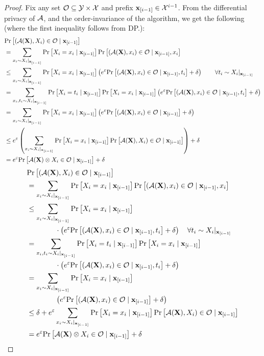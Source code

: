 \begin{proof}
Fix any set $\mathcal{O} \subseteq \mathcal{Y} \times \mathcal{X}$ and prefix $\mathbf{x}_{[i-1]} \in \mathcal{X}^{i-1}$. From the differential privacy of $\mathcal{A}$, and the order-invariance of the algorithm, we get the following (where the first inequality follows from DP.):
\ifnum{}
\begin{align*}
& \mathrm{Pr}\left[(\mathcal{A}(\mathbf{X}),X_i )  \in\mathcal{O}  \mid \mathbf{x}_{[i-1]}\right]\\
&= \sum_{x_i \sim X_i |_{\mathbf{x}_{[i-1]}}}\mathrm{Pr}\left[X_i = x_i \mid \mathbf{x}_{[i-1]}\right] \mathrm{Pr}\left[(\mathcal{A}(\mathbf{X}),x_i ) \in \mathcal{O}  \mid \mathbf{x}_{[i-1]}, x_i\right] \\
&\leq \sum_{x_i \sim X_i |_{\mathbf{x}_{[i-1]}}}\mathrm{Pr}\left[X_i = x_i\mid \mathbf{x}_{[i-1]}\right]\left( e^{\varepsilon} \mathrm{Pr}\left[(\mathcal{A}(\mathbf{X}),x_i ) \in \mathcal{O} \mid \mathbf{x}_{[i-1]}, t_i\right] + \delta \right)
\qquad \forall t_i \sim X_i |_{\mathbf{x}_{[i-1]}}\\
&= \sum_{x_i,t_i \sim X_i |_{\mathbf{x}_{[i-1]}}}\mathrm{Pr}\left[X_i = t_i \mid \mathbf{x}_{[i-1]}\right]\mathrm{Pr}\left[X_i = x_i\mid \mathbf{x}_{[i-1]}\right]\left( e^{\varepsilon} \mathrm{Pr}\left[(\mathcal{A}(\mathbf{X}),x_i ) \in \mathcal{O} \mid \mathbf{x}_{[i-1]}, t_i\right] + \delta \right)
\\
&= \sum_{x_i \sim X_i |_{\mathbf{x}_{[i-1]}}}\mathrm{Pr}\left[X_i = x_i\mid \mathbf{x}_{[i-1]}\right]\left( e^{\varepsilon} \mathrm{Pr}\left[(\mathcal{A}(\mathbf{X}),x_i ) \in \mathcal{O} \mid \mathbf{x}_{[i-1]}\right] + \delta \right)\\
&\leq e^{\varepsilon}\left(\sum_{x_i \sim X_i |_{\mathbf{x}_{[i-1]}}} \mathrm{Pr}\left[X_i = x_i\mid \mathbf{x}_{[i-1]}\right]\mathrm{Pr}\left[\mathcal{A}(\mathbf{X}),X_i ) \in \mathcal{O} \mid \mathbf{x}_{[i-1]}\right]\right) + \delta\\
&= e^{\varepsilon}\mathrm{Pr}\left[\mathcal{A}(\mathbf{X}) \otimes X_i   \in \mathcal{O}  \mid \mathbf{x}_{[i-1]}\right] + \delta
\end{align*}
\else
\begin{align*}
& \mathrm{Pr}\left[(\mathcal{A}(\mathbf{X}),X_i )  \in\mathcal{O}  \mid \mathbf{x}_{[i-1]}\right]\\
&= \sum_{x_i \sim X_i |_{\mathbf{x}_{[i-1]}}}\mathrm{Pr}\left[X_i = x_i \mid \mathbf{x}_{[i-1]}\right] \mathrm{Pr}\left[(\mathcal{A}(\mathbf{X}),x_i ) \in \mathcal{O}  \mid \mathbf{x}_{[i-1]}, x_i\right] \\
&\leq \sum_{x_i \sim X_i |_{\mathbf{x}_{[i-1]}}}\mathrm{Pr}\left[X_i = x_i\mid \mathbf{x}_{[i-1]}\right] \\
& \qquad \qquad \cdot \left( e^{\varepsilon} \mathrm{Pr}\left[(\mathcal{A}(\mathbf{X}),x_i ) \in \mathcal{O} \mid \mathbf{x}_{[i-1]}, t_i\right] + \delta \right)
\quad \forall t_i \sim X_i |_{\mathbf{x}_{[i-1]}}\\
&= \sum_{x_i,t_i \sim X_i |_{\mathbf{x}_{[i-1]}}}\mathrm{Pr}\left[X_i = t_i \mid \mathbf{x}_{[i-1]}\right]\mathrm{Pr}\left[X_i = x_i\mid \mathbf{x}_{[i-1]}\right]\\
& \qquad \qquad \cdot \left( e^{\varepsilon} \mathrm{Pr}\left[(\mathcal{A}(\mathbf{X}),x_i ) \in \mathcal{O} \mid \mathbf{x}_{[i-1]}, t_i\right] + \delta \right)
\\
&= \sum_{x_i \sim X_i |_{\mathbf{x}_{[i-1]}}}\mathrm{Pr}\left[X_i = x_i\mid \mathbf{x}_{[i-1]}\right]\\
& \qquad \qquad \left( e^{\varepsilon} \mathrm{Pr}\left[(\mathcal{A}(\mathbf{X}),x_i ) \in \mathcal{O} \mid \mathbf{x}_{[i-1]}\right] + \delta \right)\\
&\leq \delta + e^{\varepsilon}\sum_{x_i \sim X_i |_{\mathbf{x}_{[i-1]}}} \mathrm{Pr}\left[X_i = x_i\mid \mathbf{x}_{[i-1]}\right]\mathrm{Pr}\left[\mathcal{A}(\mathbf{X}),X_i ) \in \mathcal{O} \mid \mathbf{x}_{[i-1]}\right] \\
&= e^{\varepsilon}\mathrm{Pr}\left[\mathcal{A}(\mathbf{X}) \otimes X_i   \in \mathcal{O}  \mid \mathbf{x}_{[i-1]}\right] + \delta
\end{align*}
\fi


\end{proof}
